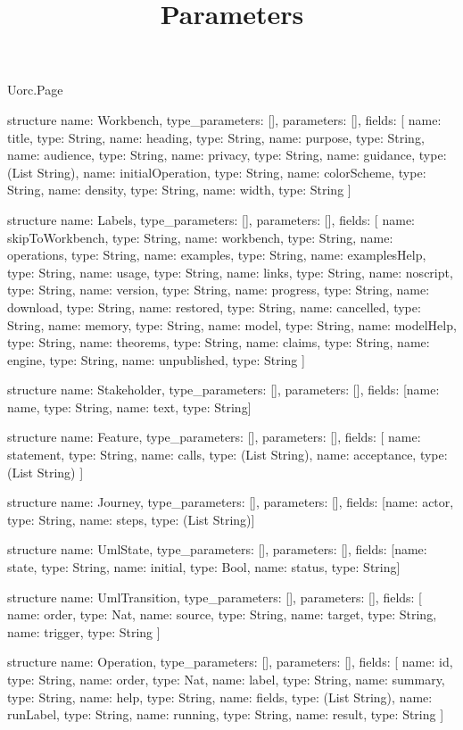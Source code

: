 \begin{lexlean}{Uorc.Page}
\title{Parameters}
\begin{semanticmodule}
structure{
  name: Workbench,
  type_parameters: [],
  parameters: [],
  fields: [
    {name: title, type: String},
    {name: heading, type: String},
    {name: purpose, type: String},
    {name: audience, type: String},
    {name: privacy, type: String},
    {name: guidance, type: (List String)},
    {name: initialOperation, type: String},
    {name: colorScheme, type: String},
    {name: density, type: String},
    {name: width, type: String}
  ]
}

structure{
  name: Labels,
  type_parameters: [],
  parameters: [],
  fields: [
    {name: skipToWorkbench, type: String},
    {name: workbench, type: String},
    {name: operations, type: String},
    {name: examples, type: String},
    {name: examplesHelp, type: String},
    {name: usage, type: String},
    {name: links, type: String},
    {name: noscript, type: String},
    {name: version, type: String},
    {name: progress, type: String},
    {name: download, type: String},
    {name: restored, type: String},
    {name: cancelled, type: String},
    {name: memory, type: String},
    {name: model, type: String},
    {name: modelHelp, type: String},
    {name: theorems, type: String},
    {name: claims, type: String},
    {name: engine, type: String},
    {name: unpublished, type: String}
  ]
}

structure{
  name: Stakeholder,
  type_parameters: [],
  parameters: [],
  fields: [{name: name, type: String}, {name: text, type: String}]
}

structure{
  name: Feature,
  type_parameters: [],
  parameters: [],
  fields: [
    {name: statement, type: String},
    {name: calls, type: (List String)},
    {name: acceptance, type: (List String)}
  ]
}

structure{
  name: Journey,
  type_parameters: [],
  parameters: [],
  fields: [{name: actor, type: String}, {name: steps, type: (List String)}]
}

structure{
  name: UmlState,
  type_parameters: [],
  parameters: [],
  fields: [{name: state, type: String}, {name: initial, type: Bool}, {name: status, type: String}]
}

structure{
  name: UmlTransition,
  type_parameters: [],
  parameters: [],
  fields: [
    {name: order, type: Nat},
    {name: source, type: String},
    {name: target, type: String},
    {name: trigger, type: String}
  ]
}

structure{
  name: Operation,
  type_parameters: [],
  parameters: [],
  fields: [
    {name: id, type: String},
    {name: order, type: Nat},
    {name: label, type: String},
    {name: summary, type: String},
    {name: help, type: String},
    {name: fields, type: (List String)},
    {name: runLabel, type: String},
    {name: running, type: String},
    {name: result, type: String}
  ]
}


\end{semanticmodule}
\end{lexlean}
